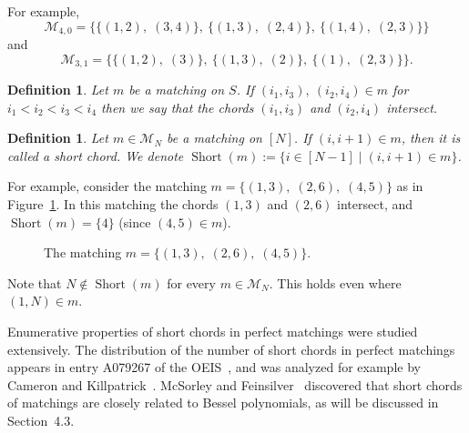 \documentclass[11pt]{article}
\newtheorem{definition}[theo]{Definition}
\theoremstyle{definition}
\numberwithin{equation}{section}
\newcommand{\Short}{\operatorname{Short}}
\newcommand{\M}{\mathcal{M}}
\begin{document}
For example, 
\[
    \M_{4,0} = \big\{\{(1,2),\; (3,4)\},\ \{(1,3),\; (2,4)\},\ \{(1,4),\; (2,3)\}\big\}
\]
and
\[ 
    \M_{3,1} = \big\{\{(1,2),\; (3)\},\ \{(1,3),\; (2)\},\ \{(1),\; (2,3)\}\big\}.
\]

\begin{definition}
\label{def:intersect}
    Let $m$ be a matching on $S$. If $(i_1, i_3),\: (i_2,i_4) \in m$ for $i_1 < i_2 < i_3 < i_4$ then we say that the chords $(i_1, i_3)$ and $(i_2, i_4)$ \emph{intersect}.
\end{definition}

\begin{definition}
\label{def:short}
    Let $m \in \M_N$ be a matching on $[N]$. If $(i,i+1) \in m$, then it is called a \emph{short chord}. We denote $\Short(m) := \{i \in [N-1] \mid (i,i+1) \in m\}$.

\end{definition}

For example, consider the matching $m = \{(1,3),\; (2,6),\; (4,5)\}$ as in Figure~\ref{fig:matching example introduction}. In this matching the chords $(1,3)$ and $(2,6)$ intersect, and $\Short(m) = \{4\}$ (since $(4,5) \in m$).
\begin{figure}[htb]
    \begin{center}
    \end{center}
    \caption{The matching $m = \{(1,3),\; (2,6),\; (4,5)\}$.}
    \label{fig:matching example introduction}
\end{figure}

Note that $N \notin \Short(m)$ for every $m \in \M_N$. This holds even where $(1,N) \in m$.



Enumerative properties of short chords in perfect matchings were studied extensively. The distribution of the number of short chords in perfect matchings appears in entry A079267 of the OEIS~\cite{oeis}, and was analyzed for example by Cameron and Killpatrick~\cite{killpatrick2020statistics}. McSorley and Feinsilver~\cite{bessel_polynomials_mathcings} discovered that short chords of matchings are closely related to Bessel polynomials, as will be discussed in Section~4.3.
\end{document}
